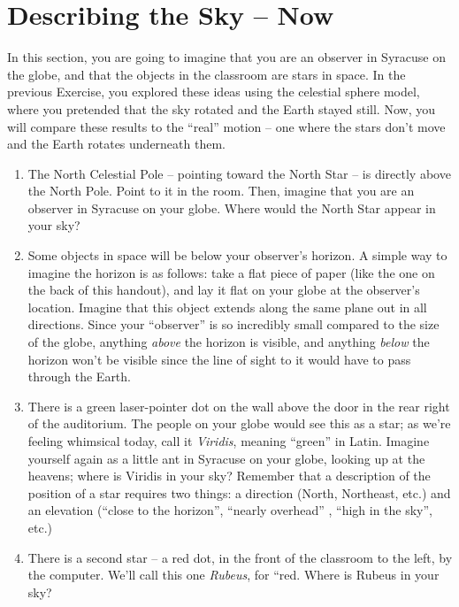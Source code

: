 \documentclass[12pt]{article}
\begin{document}
\section{Describing the Sky -- Now}

In this section, you are going to imagine that you are an observer in Syracuse on the globe, 
and that the objects in the classroom are stars in space. In the previous Exercise, you explored these ideas using the celestial sphere model, where you pretended that the sky rotated and the Earth stayed still. Now, you will compare these results to the ``real'' motion -- one where the stars don't move and the Earth rotates underneath them.

\begin{enumerate}
\item The North Celestial Pole -- pointing toward the North Star -- is directly above the North Pole.
Point to it in the room. Then, imagine that you are an observer in Syracuse on your globe. Where would the North Star appear in your sky?

\vspace{1in}

\item Some objects in space will be below your observer's horizon. A simple way to imagine the horizon is as follows: take a flat piece of paper (like the one on the back of this handout), and lay it flat on your globe at the observer's location. Imagine that this object extends along the same plane out in all directions. Since your ``observer'' is so incredibly small compared to the size of the globe, anything {\it above} the horizon is visible, and anything {\it below} the horizon won't be visible since the line of sight to it would have to pass through the Earth. 

\item There is a green laser-pointer dot on the wall above the door in the rear right of the auditorium. The people on your globe would see this as a star; as we're feeling whimsical today, call it {\it Viridis}, meaning ``green'' in Latin. Imagine yourself again as a little ant in Syracuse on your globe, looking up at the heavens; where is Viridis in your sky? Remember that a description of the position of a star requires two things: a direction (North, Northeast, etc.) and an elevation (``close to the horizon'', ``nearly overhead'' , ``high in the sky'',
etc.) 

\vspace{1in}

\item There is a second star -- a red dot, in the front of the classroom to the left, by the computer. We'll call this one {\it Rubeus}, for ``red.
Where is Rubeus in your sky?

\vspace{1in}

\end{enumerate}
\end{document}
